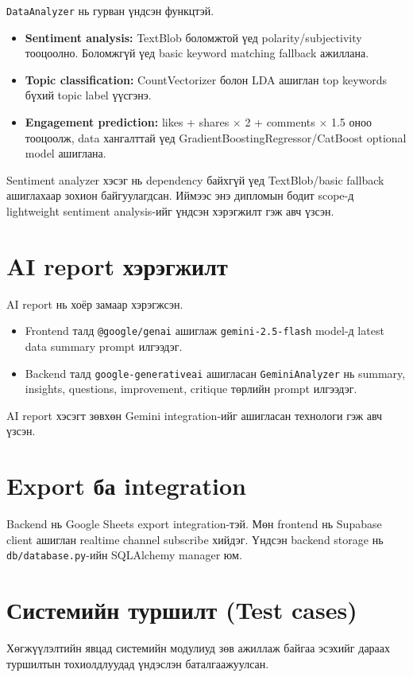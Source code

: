 \documentclass[
12pt,
oneside,
english,
onehalfspacing,
nolistspacing,
headsepline,
]{MUST-Thesis}
\begin{document}
\texttt{DataAnalyzer} нь гурван үндсэн функцтэй.

\begin{itemize}
    \item \textbf{Sentiment analysis:} TextBlob боломжтой үед polarity/subjectivity тооцоолно. Боломжгүй үед basic keyword matching fallback ажиллана.
    \item \textbf{Topic classification:} CountVectorizer болон LDA ашиглан top keywords бүхий topic label үүсгэнэ.
    \item \textbf{Engagement prediction:} likes + shares $\times$ 2 + comments $\times$ 1.5 оноо тооцоолж, data хангалттай үед GradientBoostingRegressor/CatBoost optional model ашиглана.
\end{itemize}

Sentiment analyzer хэсэг нь dependency байхгүй үед TextBlob/basic fallback ашиглахаар зохион байгуулагдсан. Иймээс энэ дипломын бодит scope-д lightweight sentiment analysis-ийг үндсэн хэрэгжилт гэж авч үзсэн.

\section{AI report хэрэгжилт}

AI report нь хоёр замаар хэрэгжсэн.

\begin{itemize}
    \item Frontend талд \texttt{@google/genai} ашиглаж \texttt{gemini-2.5-flash} model-д latest data summary prompt илгээдэг.
    \item Backend талд \texttt{google-generativeai} ашигласан \texttt{GeminiAnalyzer} нь summary, insights, questions, improvement, critique төрлийн prompt илгээдэг.
\end{itemize}

AI report хэсэгт зөвхөн Gemini integration-ийг ашигласан технологи гэж авч үзсэн.

\section{Export ба integration}

Backend нь Google Sheets export integration-тэй. Мөн frontend нь Supabase client ашиглан realtime channel subscribe хийдэг. Үндсэн backend storage нь \texttt{db/database.py}-ийн SQLAlchemy manager юм.

\section{Системийн туршилт (Test cases)}
Хөгжүүлэлтийн явцад системийн модулиуд зөв ажиллаж байгаа эсэхийг дараах туршилтын тохиолдлуудад үндэслэн баталгаажуулсан.
\end{document}

